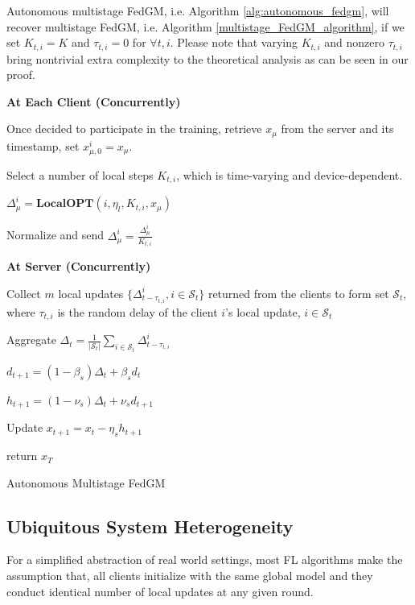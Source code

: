 Autonomous multistage FedGM, i.e. Algorithm \ref{alg:autonomous_fedgm}, will recover multistage FedGM, i.e. Algorithm \ref{multistage_FedGM_algorithm}, if we set $K_{t,i}=K$ and $\tau_{t,i}=0$ for $\forall t, i$. Please note that varying $K_{t,i}$ and nonzero $\tau_{t,i}$ bring nontrivial extra complexity to the theoretical analysis as can be seen in our proof.

\begin{algorithm2e}[tb]
\SetAlgoVlined
{}
\SetAlgoLined
{}
{
{   
    \colorbox{babyblueeyes}{\textbf{At Each Client (Concurrently)}}
    
    Once decided to participate in the training, retrieve $x_\mu$ from the server and its timestamp, set $x_{\mu,0}^i=x_\mu$.

    Select a number of local steps $K_{t,i}$, which is time-varying and device-dependent.

    $\Delta_\mu^i=\textbf{LocalOPT}\left(i,\eta_l,K_{t,i},x_\mu\right)$

    Normalize and send $\Delta_\mu^i=\frac{\Delta_\mu^i}{K_{t,i}}$
    

    \colorbox{babyblueeyes}{\textbf{At Server (Concurrently)}}
    
    Collect $m$ local updates $\{\Delta_{t-\tau_{t,i}}^i, i\in\mathcal{S}_t\}$ returned from the clients to form set $\mathcal{S}_t$, where $\tau_{t,i}$ is the random delay of the client $i$'s local update, $i\in\mathcal{S}_t$

    Aggregate $\Delta_t=\frac{1}{\lvert\mathcal{S}_t\rvert}\sum_{i\in \mathcal{S}_t}\Delta_{t-\tau_{t,i}}^i$

    $d_{t+1}=(1-\beta_s)\Delta_{t}+\beta_s d_{t}$

    $h_{t+1}=(1-\nu_s)\Delta_{t}+\nu_s d_{t+1}$
        
    Update $x_{t+1}=x_t-\eta_s h_{t+1}$

}
}
return $x_T$
\caption{\colorbox{babyblueeyes}{Autonomous Multistage FedGM}}
\label{alg:autonomous_fedgm}
\end{algorithm2e}


\iffalse

\subsection{Ubiquitous System Heterogeneity}

For a simplified abstraction of real world settings, most FL algorithms make the assumption that, all clients initialize with the same global model and they conduct identical number of local updates at any given round.

